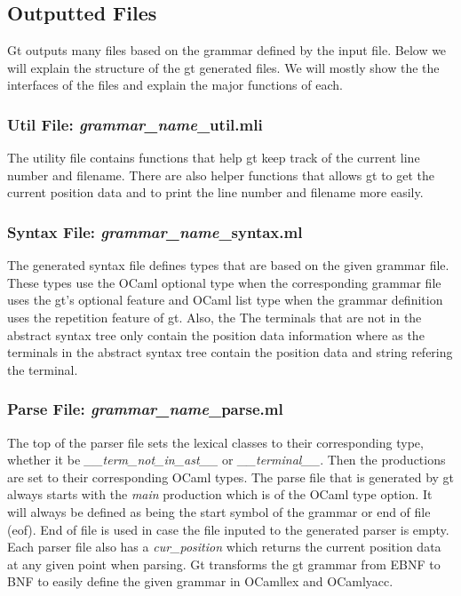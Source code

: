 \subsection{Outputted Files}
Gt outputs many files based on the grammar defined by the input file. Below 
we will explain the structure of the gt generated files. We will mostly show the
the interfaces of the files and explain the major functions of each.
%
%
\subsubsection{Util File: \textit{grammar\_name}\_util.mli}
The utility file contains functions that help gt keep track of the current
line number and filename. There are also helper functions that allows
gt to get the current position data and to print the line number and filename 
more easily.\\

%
%
%
\subsubsection{Syntax File: \textit{grammar\_name}\_syntax.ml}
The generated syntax file defines types that are based on the given grammar file.
These types use the OCaml optional type when the corresponding grammar file uses
the gt's optional feature and OCaml list type when the grammar definition
uses the repetition feature of gt. Also, the The terminals that are not in the abstract syntax
tree only contain the position data information where as the terminals in the abstract syntax
tree contain the position data and string refering the terminal.\\

%
%
\subsubsection{Parse File: \textit{grammar\_name}\_parse.ml}
The top of the parser file sets the lexical classes to their corresponding type, whether 
it be \textit{\_\_term\_not\_in\_ast\_\_} or \textit{\_\_terminal\_\_}. Then the productions
are set to their corresponding OCaml types. The parse file that is generated by gt always starts 
with the \textit{main} production which is of the OCaml type option. It will always be defined as being 
the start symbol of the grammar or end of file (eof). End of file is used in case the file inputed to 
the generated parser is empty. Each parser file also has a \textit{cur\_position} which 
returns the current position data at any given point when parsing. Gt transforms the gt grammar 
from EBNF to BNF to easily define the given grammar in OCamllex and OCamlyacc.\\

%
%
%
